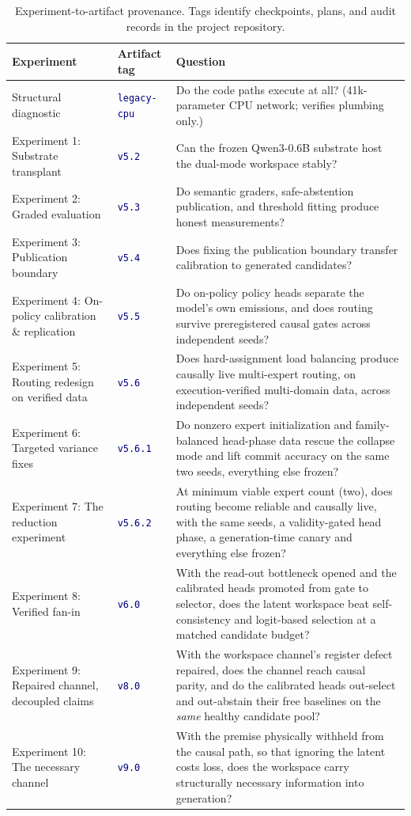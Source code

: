 \documentclass[10pt,a4paper]{article}
\newcommand{\studytag}[1]{\colorbox{navy!10}{\textcolor{navy}{\footnotesize\texttt{#1}}}}
\begin{document}
\begin{table}[htbp]
\caption{Experiment-to-artifact provenance. Tags identify checkpoints, plans, and
audit records in the project repository.}
\label{tab:provenance}
\centering\small
\begin{tabularx}{\textwidth}{@{}llX@{}}
\toprule
\textbf{Experiment} & \textbf{Artifact tag} & \textbf{Question} \\
\midrule
Structural diagnostic & \studytag{legacy-cpu} & Do the code paths execute at all? (41k-parameter CPU network; verifies plumbing only.) \\
Experiment 1: Substrate transplant & \studytag{v5.2} & Can the frozen Qwen3-0.6B substrate host the dual-mode workspace stably? \\
Experiment 2: Graded evaluation & \studytag{v5.3} & Do semantic graders, safe-abstention publication, and threshold fitting produce honest measurements? \\
Experiment 3: Publication boundary & \studytag{v5.4} & Does fixing the publication boundary transfer calibration to generated candidates? \\
Experiment 4: On-policy calibration \& replication & \studytag{v5.5} & Do on-policy policy heads separate the model's own emissions, and does routing survive preregistered causal gates across independent seeds? \\
Experiment 5: Routing redesign on verified data & \studytag{v5.6} & Does hard-assignment load balancing produce causally live multi-expert routing, on execution-verified multi-domain data, across independent seeds? \\
Experiment 6: Targeted variance fixes & \studytag{v5.6.1} & Do nonzero expert initialization and family-balanced head-phase data rescue the collapse mode and lift commit accuracy on the same two seeds, everything else frozen? \\
Experiment 7: The reduction experiment & \studytag{v5.6.2} & At minimum viable expert count (two), does routing become reliable and causally live, with the same seeds, a validity-gated head phase, a generation-time canary and everything else frozen? \\
Experiment 8: Verified fan-in & \studytag{v6.0} & With the read-out bottleneck opened and the calibrated heads promoted from gate to selector, does the latent workspace beat self-consistency and logit-based selection at a matched candidate budget? \\
Experiment 9: Repaired channel, decoupled claims & \studytag{v8.0} & With the workspace channel's register defect repaired, does the channel reach causal parity, and do the calibrated heads out-select and out-abstain their free baselines on the \emph{same} healthy candidate pool? \\
Experiment 10: The necessary channel & \studytag{v9.0} & With the premise physically withheld from the causal path, so that ignoring the latent costs loss, does the workspace carry structurally necessary information into generation? \\
\bottomrule
\end{tabularx}
\end{table}
\end{document}
